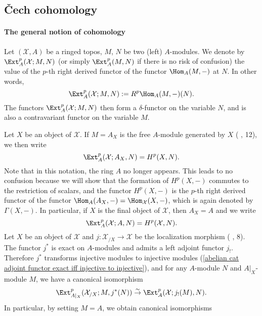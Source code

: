 \subsection{\v{C}ech cohomology}
\paragraph{The general notion of cohomology}\label{ringed topos cohomology def paragarph}
Let $(\mathcal{X},A)$ be a ringed topos, $M$, $N$ be two (left) $A$-modules. We denote by $\Ext_A^p(\mathcal{X};M,N)$ (or simply $\Ext_A^p(M,N)$ if there is no risk of confusion) the value of the $p$-th right derived functor of the functor $\Hom_A(M,-)$ at $N$. In other words,
\begin{equation}\label{ringed topos cohomology def-1}
\Ext_A^p(\mathcal{X};M,N):=R^p\Hom_A(M,-)(N).
\end{equation}
The functors $\Ext^p_A(\mathcal{X};M,N)$ then form a $\delta$-functor on the variable $N$, and is also a contravariant functor on the variable $M$.\par
Let $X$ be an object of $\mathcal{X}$. If $M=A_X$ is the free $A$-module generated by $X$ (\cite{SGA4-1} , 12), we then write
\begin{equation}\label{ringed topos cohomology def-2}
\Ext_A^p(\mathcal{X};A_X,N)=H^p(X,N).
\end{equation}
Note that in this notation, the ring $A$ no longer appears. This leads to no confusion because we will show that the formation of $H^p(X,-)$ commutes to the restriction of scalars, and the functor $H^p(X,-)$ is the $p$-th right derived functor of the functor $\Hom_A(A_X,-)=\Hom_\mathcal{X}(X,-)$, which is again denoted by $\Gamma(X,-)$. In particular, if $X$ is the final object of $\mathcal{X}$, then $A_X=A$ and we write
\[\Ext_A^p(\mathcal{X};A,N)=H^p(\mathcal{X},N).\]
Let $X$ be an object of $\mathcal{X}$ and $j:\mathcal{X}_{/X}\to \mathcal{X}$ be the localization morphism (\cite{SGA4-1} , 8). The functor $j^*$ is exact on $A$-modules and admits a left adjoint functor $j_!$. Therefore $j^*$ transforms injective modules to injective modules (\cref{abelian cat adjoint functor exact iff injective to injective}), and for any $A$-module $N$ and $A|_X$-module $M$, we have a canonical isomorphism
\begin{equation}\label{ringed topos Ext localization to object}
\Ext_{A|_X}^p(\mathcal{X}_{/X};M,j^*(N)) \stackrel{\sim}{\to } \Ext_A^p(\mathcal{X};j_!(M),N).
\end{equation}
In particular, by setting $M=A$, we obtain canonical isomorphisms

